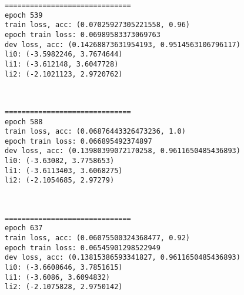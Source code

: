 \documentclass[11pt]{article}
\begin{document}
    \begin{Verbatim}[commandchars=\\\{\}]
==============================
epoch 539
train loss, acc: (0.07025927305221558, 0.96)
epoch train loss: 0.06989583373069763
dev loss, acc: (0.14268873631954193, 0.9514563106796117)
li0: (-3.5982246, 3.7674644)
li1: (-3.612148, 3.6047728)
li2: (-2.1021123, 2.9720762)

    \end{Verbatim}

    \begin{center}
    \end{center}
    { \hspace*{\fill} \\}
    
    \begin{Verbatim}[commandchars=\\\{\}]
==============================
epoch 588
train loss, acc: (0.06876443326473236, 1.0)
epoch train loss: 0.066895492374897
dev loss, acc: (0.13980399072170258, 0.9611650485436893)
li0: (-3.63082, 3.7758653)
li1: (-3.6113403, 3.6068275)
li2: (-2.1054685, 2.97279)

    \end{Verbatim}

    \begin{center}
    \end{center}
    { \hspace*{\fill} \\}
    
    \begin{Verbatim}[commandchars=\\\{\}]
==============================
epoch 637
train loss, acc: (0.06075500324368477, 0.92)
epoch train loss: 0.06545901298522949
dev loss, acc: (0.13815386593341827, 0.9611650485436893)
li0: (-3.6608646, 3.7851615)
li1: (-3.6086, 3.6094832)
li2: (-2.1075828, 2.9750142)

    \end{Verbatim}

    \begin{center}
    \end{center}
    { \hspace*{\fill} \\}
    
\end{document}
